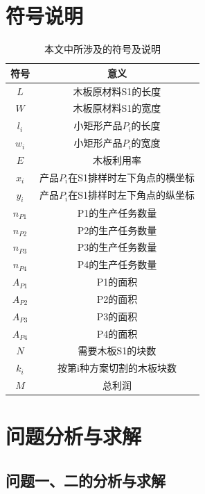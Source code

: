 \documentclass[hyperref,UTF8]{article}
\begin{document}
{\section{符号说明}
\begin{table}[htbp]
\centering
\caption{本文中所涉及的符号及说明}\label{abs}
\begin{tabular}{|c|c|}
\hline
符号&意义\\
\hline
$L$ & 木板原材料S1的长度 \\
$W$ & 木板原材料S1的宽度 \\
$l_i$ & 小矩形产品$P_i$的长度 \\
 $w_i$& 小矩形产品$P_i$的宽度 \\
$E$ & 木板利用率 \\
$x_i$ & 产品$P_i$在S1排样时左下角点的横坐标 \\
$y_i$ & 产品$P_i$在S1排样时左下角点的纵坐标 \\
$n_{P1}$ & P1的生产任务数量 \\
 $n_{P2}$& P2的生产任务数量 \\
$n_{P3}$ & P3的生产任务数量 \\
$n_{P4}$ & P4的生产任务数量 \\
$A_{P1}$ & P1的面积 \\
$A_{P2}$ & P2的面积 \\
 $A_{P3}$& P3的面积 \\
 $A_{P4}$& P4的面积 \\
$N$ & 需要木板S1的块数 \\
 $ k_i$& 按第i种方案切割的木板块数 \\
$M$& 总利润 \\\hline
\end{tabular}%
\end{table}

\section{问题分析与求解}


\subsection{问题一、二的分析与求解}
}
\end{document}
